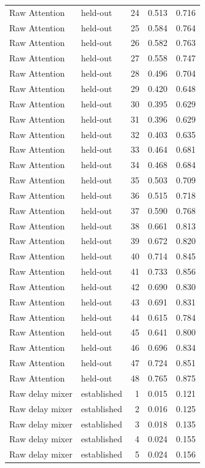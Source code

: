 \begin{tabular}{llrrr}
Raw Attention & held-out & 24 & 0.513 & 0.716 \\
Raw Attention & held-out & 25 & 0.584 & 0.764 \\
Raw Attention & held-out & 26 & 0.582 & 0.763 \\
Raw Attention & held-out & 27 & 0.558 & 0.747 \\
Raw Attention & held-out & 28 & 0.496 & 0.704 \\
Raw Attention & held-out & 29 & 0.420 & 0.648 \\
Raw Attention & held-out & 30 & 0.395 & 0.629 \\
Raw Attention & held-out & 31 & 0.396 & 0.629 \\
Raw Attention & held-out & 32 & 0.403 & 0.635 \\
Raw Attention & held-out & 33 & 0.464 & 0.681 \\
Raw Attention & held-out & 34 & 0.468 & 0.684 \\
Raw Attention & held-out & 35 & 0.503 & 0.709 \\
Raw Attention & held-out & 36 & 0.515 & 0.718 \\
Raw Attention & held-out & 37 & 0.590 & 0.768 \\
Raw Attention & held-out & 38 & 0.661 & 0.813 \\
Raw Attention & held-out & 39 & 0.672 & 0.820 \\
Raw Attention & held-out & 40 & 0.714 & 0.845 \\
Raw Attention & held-out & 41 & 0.733 & 0.856 \\
Raw Attention & held-out & 42 & 0.690 & 0.830 \\
Raw Attention & held-out & 43 & 0.691 & 0.831 \\
Raw Attention & held-out & 44 & 0.615 & 0.784 \\
Raw Attention & held-out & 45 & 0.641 & 0.800 \\
Raw Attention & held-out & 46 & 0.696 & 0.834 \\
Raw Attention & held-out & 47 & 0.724 & 0.851 \\
Raw Attention & held-out & 48 & 0.765 & 0.875 \\
Raw delay mixer & established & 1 & 0.015 & 0.121 \\
Raw delay mixer & established & 2 & 0.016 & 0.125 \\
Raw delay mixer & established & 3 & 0.018 & 0.135 \\
Raw delay mixer & established & 4 & 0.024 & 0.155 \\
Raw delay mixer & established & 5 & 0.024 & 0.156 \\

\end{tabular}
